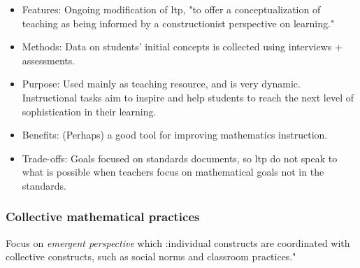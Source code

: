 \documentclass{TC}
\begin{document}
\begin{multicols}{2}
\begin{itemize}
\item Features: Ongoing modification of \gls{ltp}, "to offer a conceptualization of teaching as being informed by a constructionist perspective on learning."
\item Methods: Data on students' initial concepts is collected using interviews + assessments.
\item Purpose: Used mainly as teaching resource, and is very dynamic. Instructional tasks aim to inspire and help students to reach the next level of sophistication in their learning.
\item Benefits: (Perhaps) a good tool for improving mathematics instruction. 
\item Trade-offs: Goals focused on standards documents, so \gls{ltp} do not speak to what is possible when teachers focus on mathematical goals not in the standards.
 \end{itemize}
 \end{multicols}
 
\subsubsection{Collective mathematical practices}

 Focus on \emph{emergent perspective} which :individual constructs are coordinated with collective constructs, such as social norms and classroom practices."
 
\end{document}
